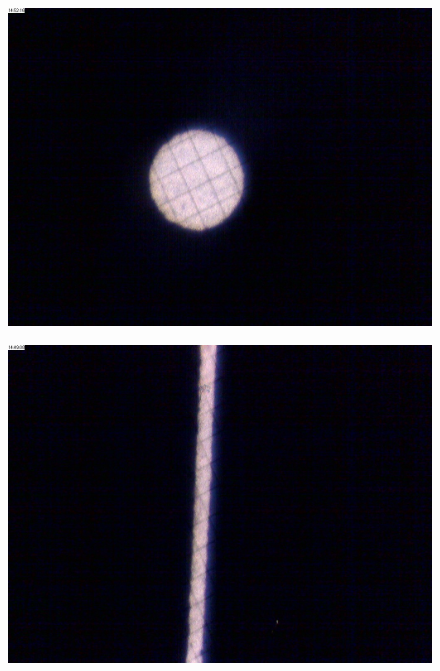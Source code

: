 \begin{figure}[htbp]
    \centering
    \begin{minipage}[ht]{0.48\hsize}\centering
        \includegraphics[width=\linewidth]{src/figures/result/circle_slit.jpg}
        \label{subfig:circle_slit}
    \end{minipage}
    \begin{minipage}[ht]{0.48\hsize}\centering
        \includegraphics[width=\linewidth]{src/figures/result/ss1_slit.jpg}
        \label{subfig:ss1_slit}
    \end{minipage}
    \begin{minipage}[ht]{0.48\hsize}\centering

\end{minipage}
\end{figure}
